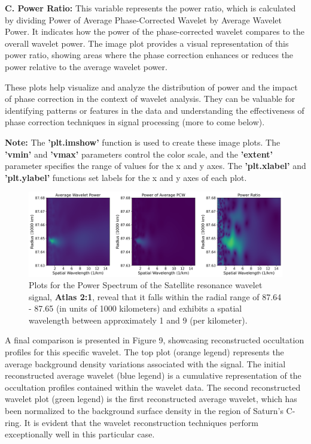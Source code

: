 \documentclass{article}
\begin{document}
\textbf{C. Power Ratio:}
This variable represents the power ratio, which is calculated by dividing Power of Average Phase-Corrected Wavelet by Average Wavelet Power. It indicates how the power of the phase-corrected wavelet compares to the overall wavelet power. The image plot provides a visual representation of this power ratio, showing areas where the phase correction enhances or reduces the power relative to the average wavelet power.

These plots help visualize and analyze the distribution of power and the impact of phase correction in the context of wavelet analysis. They can be valuable for identifying patterns or features in the data and understanding the effectiveness of phase correction techniques in signal processing (more to come below).

\vspace{0.5}

\textbf{Note:}
The \textbf{'plt.imshow'} function is used to create these image plots. The \textbf{'vmin'} and \textbf{'vmax'} parameters control the color scale, and the \textbf{'extent'} parameter specifies the range of values for the x and y axes. The \textbf{'plt.xlabel'} and \textbf{'plt.ylabel'} functions set labels for the x and y axes of each plot.

\begin{figure}[h]
\centering 
\includegraphics[width=1.0\textwidth]{power_ratio_plotw87.png} 
\caption{Plots for the Power Spectrum of the Satellite resonance wavelet signal, \textbf{Atlas 2:1}, reveal that it falls within the radial range of 87.64 - 87.65 (in units of 1000 kilometers) and exhibits a spatial wavelength between approximately 1 and 9 (per kilometer).} \label{fig:my_label}
\end{figure}


A final comparison is presented in Figure 9, showcasing reconstructed occultation profiles for this specific wavelet. The top plot (orange legend) represents the average background density variations associated with the signal. The initial reconstructed average wavelet (blue legend) is a cumulative representation of the occultation profiles contained within the wavelet data. The second reconstructed wavelet plot (green legend) is the first reconstructed average wavelet, which has been normalized to the background surface density in the region of Saturn's C-ring. It is evident that the wavelet reconstruction techniques perform exceptionally well in this particular case.
\end{document}
